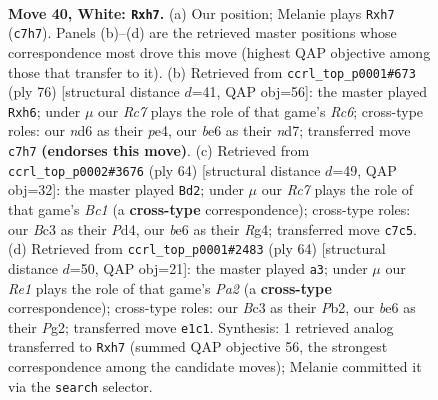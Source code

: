 \documentclass[11pt]{article}
\begin{document}
\clearpage

\begin{figure}[p]\centering
\begin{subfigure}{0.46\textwidth}\centering
\resizebox{\linewidth}{!}{%
\newchessgame
\chessboard[
  setfen={5k2/2R4p/1r1nb3/1p4p1/r7/2B1P1P1/P4PKP/4R3 w - - 4 40},
  showmover=false,
  pgfstyle=straightmove, color=movearrow, markmove={c7-h7}
]}
\caption{}
\end{subfigure}\hfill
\begin{subfigure}{0.46\textwidth}\centering
\resizebox{\linewidth}{!}{%
\newchessgame
\chessboard[
  setfen={1r6/3nk3/RPR4p/6p1/1r2p3/4P2P/P4PP1/6K1 w - - 5 39},
  showmover=false,
  pgfstyle=straightmove, color=movearrow, markmove={c6-h6}
]}
\caption{}
\end{subfigure}
\\[4pt]
\begin{subfigure}{0.46\textwidth}\centering
\resizebox{\linewidth}{!}{%
\newchessgame
\chessboard[
  setfen={4r2k/1pp3p1/3b3p/5r2/P2P2R1/5P1P/6P1/R1B3K1 w - - 0 33},
  showmover=false,
  pgfstyle=straightmove, color=movearrow, markmove={c1-d2}
]}
\caption{}
\end{subfigure}\hfill
\begin{subfigure}{0.46\textwidth}\centering
\resizebox{\linewidth}{!}{%
\newchessgame
\chessboard[
  setfen={3r4/ppr5/4pk2/1B6/5bPp/5P2/PP2R1P1/1K5R w - - 7 33},
  showmover=false,
  pgfstyle=straightmove, color=movearrow, markmove={a2-a3}
]}
\caption{}
\end{subfigure}
\caption{\textbf{Move 40, White: \texttt{Rxh7}.} (a) Our position; Melanie plays \texttt{Rxh7} (\texttt{c7h7}). Panels (b)--(d) are the retrieved master positions whose correspondence most drove this move (highest QAP objective among those that transfer to it). (b) Retrieved from \texttt{ccrl\_top\_p0001\#673} (ply 76) [structural distance $d$=41, QAP obj=56]: the master played \texttt{Rxh6}; under $\mu$ our \emph{Rc7} plays the role of that game's \emph{Rc6}; cross-type roles: our \emph{n}d6 as their \emph{p}e4, our \emph{b}e6 as their \emph{n}d7; transferred move \texttt{c7h7} \textbf{(endorses this move)}. (c) Retrieved from \texttt{ccrl\_top\_p0002\#3676} (ply 64) [structural distance $d$=49, QAP obj=32]: the master played \texttt{Bd2}; under $\mu$ our \emph{Rc7} plays the role of that game's \emph{Bc1} (a \textbf{cross-type} correspondence); cross-type roles: our \emph{B}c3 as their \emph{P}d4, our \emph{b}e6 as their \emph{R}g4; transferred move \texttt{c7c5}. (d) Retrieved from \texttt{ccrl\_top\_p0001\#2483} (ply 64) [structural distance $d$=50, QAP obj=21]: the master played \texttt{a3}; under $\mu$ our \emph{Re1} plays the role of that game's \emph{Pa2} (a \textbf{cross-type} correspondence); cross-type roles: our \emph{B}c3 as their \emph{P}b2, our \emph{b}e6 as their \emph{P}g2; transferred move \texttt{e1c1}. Synthesis: 1 retrieved analog transferred to \texttt{Rxh7} (summed QAP objective 56, the strongest correspondence among the candidate moves); Melanie committed it via the \texttt{search} selector.}
\label{fig:thought-m78}
\end{figure}
\end{document}
